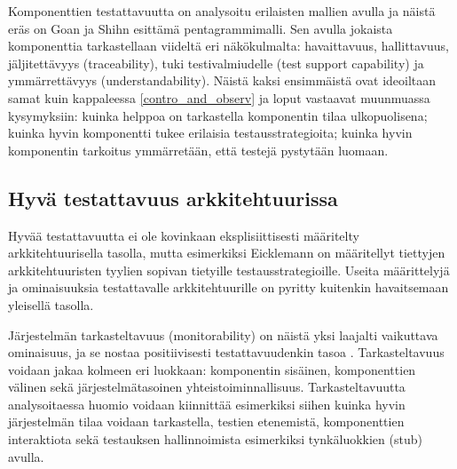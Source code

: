 \documentclass[finnish]{tktltiki2}
\theoremstyle{definition}
\theoremstyle{remark}
\begin{document}
Komponenttien testattavuutta on analysoitu erilaisten mallien avulla ja näistä eräs on Goan ja Shihn \citep{gao_component_2005} esittämä pentagrammimalli. Sen avulla jokaista komponenttia tarkastellaan viideltä eri näkökulmalta: havaittavuus, hallittavuus, jäljitettävyys (traceability), tuki testivalmiudelle (test support capability) ja ymmärrettävyys (understandability). Näistä kaksi ensimmäistä ovat ideoiltaan samat kuin kappaleessa \ref{contro_and_observ} ja loput vastaavat muunmuassa kysymyksiin: kuinka helppoa on tarkastella komponentin tilaa ulkopuolisena; kuinka hyvin komponentti tukee erilaisia testausstrategioita; kuinka hyvin komponentin tarkoitus ymmärretään, että testejä pystytään luomaan. 
 

\subsection{Hyvä testattavuus arkkitehtuurissa} \label{good_testability}


Hyvää testattavuutta ei ole kovinkaan eksplisiittisesti määritelty arkkitehtuurisella tasolla, mutta esimerkiksi Eicklemann \citep{Eickelmann:1996:MOS:243327.243602} on määritellyt tiettyjen arkkitehtuuristen tyylien sopivan tietyille testausstrategioille. Useita määrittelyjä ja ominaisuuksia testattavalle arkkitehtuurille on pyritty kuitenkin havaitsemaan yleisellä tasolla.

Järjestelmän tarkasteltavuus (monitorability) on näistä yksi laajalti vaikuttava ominaisuus, ja se nostaa positiivisesti testattavuudenkin tasoa \citep{mari_impact_2003}. Tarkasteltavuus voidaan jakaa kolmeen eri luokkaan: komponentin sisäinen, komponenttien välinen sekä järjestelmätasoinen yhteistoiminnallisuus. Tarkasteltavuutta analysoitaessa huomio voidaan kiinnittää esimerkiksi siihen kuinka hyvin järjestelmän tilaa voidaan tarkastella, testien etenemistä, komponenttien interaktiota sekä testauksen hallinnoimista esimerkiksi tynkäluokkien (stub) avulla. 

\end{document}
